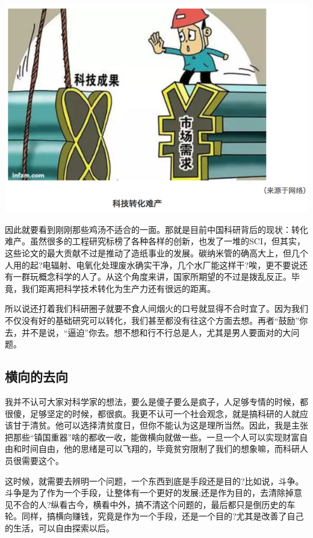 \documentclass[]{book}
\begin{document}
\includegraphics[width=8.33in]{images/kq2}

因此就要看到刚刚那些鸡汤不适合的一面。那就是目前中国科研背后的现状：转化难产。虽然很多的工程研究标榜了各种各样的创新，也发了一堆的SCI，但其实，这些论文的最大贡献不过是推动了造纸事业的发展。碳纳米管的确高大上，但几个人用的起?电辐射、电氧化处理废水确实干净，几个水厂能这样干?唉，更不要说还有一群玩概念科学的人了。从这个角度来讲，国家所期望的不过是拨乱反正。毕竟，我们距离把科学技术转化为生产力还有很远的距离。

所以说还打着我们科研圈子就要不食人间烟火的口号就显得不合时宜了。因为我们不仅没有好的基础研究可以转化，我们甚至都没有往这个方面去想。再者``鼓励''你去，并不是说，``逼迫''你去。想不想和行不行总是人，尤其是男人要面对的大问题。

\subsection{横向的去向}

我并不认可大家对科学家的想法，要么是傻子要么是疯子，人足够专情的时候，都很傻，足够坚定的时候，都很疯。我更不认可一个社会观念，就是搞科研的人就应该甘于清贫。他可以选择清贫度日，但你不能认为这是理所当然。因此，我是主张把那些``镇国重器''啥的都收一收，能做横向就做一些。一旦一个人可以实现财富自由和时间自由，他的思绪是可以飞翔的，毕竟贫穷限制了我们的想象嘛，而科研人员很需要这个。

这时候，就需要去辨明一个问题，一个东西到底是手段还是目的?比如说，斗争。斗争是为了作为一个手段，让整体有一个更好的发展;还是作为目的，去清除掉意见不合的人?纵看古今，横看中外，搞不清这个问题的，最后都只是倒历史的车轮。同样，搞横向赚钱，究竟是作为一个手段，还是一个目的?尤其是改善了自己的生活，可以自由探索以后。
\end{document}
